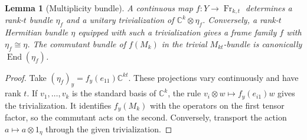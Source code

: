\documentclass[11pt]{article}
\newtheorem{lemma}[theorem]{Lemma}
\DeclareMathOperator{\End}{End}
\DeclareMathOperator{\Fr}{Fr}
\newcommand{\C}{\mathbb C}
\begin{document}
\begin{lemma}[Multiplicity bundle]\label{lem:mult}
A continuous map \(f:Y\to\Fr_{k,t}\) determines a rank-\(t\) bundle \(\eta_f\) and a unitary trivialization of \(\C^k\otimes\eta_f\). Conversely, a rank-\(t\) Hermitian bundle \(\eta\) equipped with such a trivialization gives a frame family \(f\) with \(\eta_f\cong\eta\). The commutant bundle of \(f(M_k)\) in the trivial \(M_{kt}\)-bundle is canonically \(\End(\eta_f)\).
\end{lemma}
\begin{proof}
Take \((\eta_f)_y=f_y(e_{11})\C^{kt}\). These projections vary continuously and have rank \(t\). If \(v_1,\ldots,v_k\) is the standard basis of \(\C^k\), the rule \(v_i\otimes w\mapsto f_y(e_{i1})w\) gives the trivialization. It identifies \(f_y(M_k)\) with the operators on the first tensor factor, so the commutant acts on the second. Conversely, transport the action \(a\mapsto a\otimes1_\eta\) through the given trivialization.
\end{proof}
\end{document}
